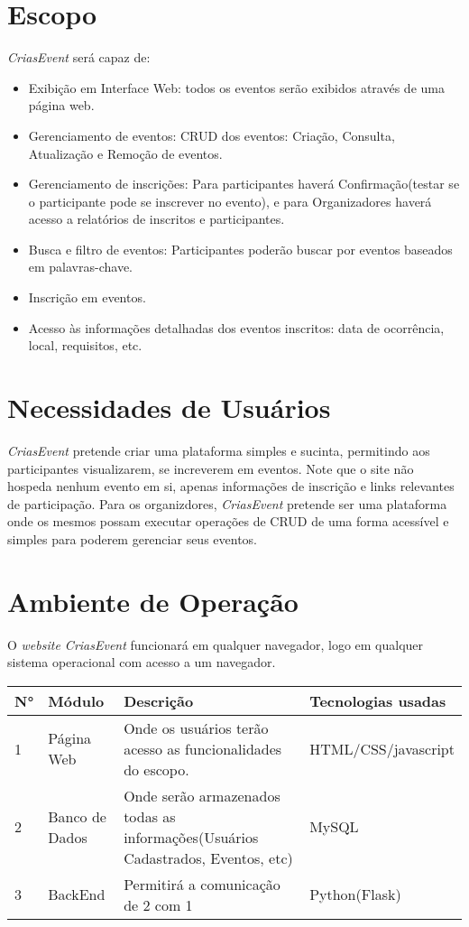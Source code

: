 \section{Escopo}
    \textit{CriasEvent} será capaz de:
    \begin{itemize}
      \item Exibição em Interface Web: todos os eventos serão exibidos através de uma página web. 
      \item Gerenciamento de eventos: CRUD dos eventos: Criação, Consulta, Atualização e Remoção de eventos.
      \item Gerenciamento de inscrições: Para participantes haverá Conﬁrmação(testar se o participante pode se inscrever no evento), e para Organizadores haverá acesso a relatórios de inscritos e participantes.
      \item Busca e ﬁltro de eventos: Participantes poderão buscar por eventos baseados em palavras-chave.
      \item Inscrição em eventos.
      \item Acesso às informações detalhadas dos eventos inscritos: data de ocorrência, local, requisitos, etc.
    \end{itemize}

\section{Necessidades de Usuários}
	\textit{CriasEvent} pretende criar uma plataforma simples e sucinta, permitindo aos participantes visualizarem, se increverem em eventos. Note que o site não hospeda nenhum evento em si, apenas informações de inscrição e links relevantes de participação. Para os organizdores, \textit{CriasEvent} pretende ser uma plataforma onde os mesmos possam executar operações de CRUD de uma forma acessível e simples para poderem gerenciar seus eventos.

\section{Ambiente de Operação}
	O \textit{website CriasEvent} funcionará em qualquer navegador, logo  em qualquer sistema operacional com acesso a um navegador.

\begin{tabular}{>{\raggedright}p{1.5cm}>{\raggedright}p{4cm}>{\raggedright}p{6cm}>{\raggedright}p{4cm}}
\toprule
  \textbf{N°} & \textbf{Módulo} & \textbf{Descrição} & \textbf{Tecnologias usadas} \tabularnewline 
\midrule
  1 & Página Web & Onde os usuários terão acesso as funcionalidades do escopo. & HTML/CSS/javascript\tabularnewline \hline
  2 & Banco de Dados & Onde serão armazenados todas as informações(Usuários Cadastrados, Eventos, etc) & MySQL\tabularnewline \hline
  3 & BackEnd & Permitirá a comunicação de 2 com 1 & Python(Flask)\tabularnewline
\bottomrule
\end{tabular}

